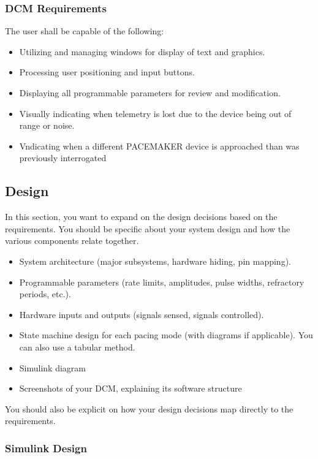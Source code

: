 \documentclass{article}
\begin{document}
\subsubsection{DCM Requirements}
The user shall be capable of the following:
\begin{itemize}
    \item Utilizing and managing windows for display of text and graphics.
    \item Processing user positioning and input buttons.
    \item Displaying all programmable parameters for review and modification.
    \item Visually indicating when telemetry is lost due to the device being out of range or noise.
    \item Vndicating when a different PACEMAKER device is approached than was previously interrogated
\end{itemize}

\newpage
\subsection{Design}
\label{dessec}
In this section, you want to expand on the design decisions based on the requirements. You should be specific about your system design and how the various components relate together.

\begin{itemize}
    \item System architecture (major subsystems, hardware hiding, pin mapping).
    \item Programmable parameters (rate limits, amplitudes, pulse widths, refractory periods, etc.).
    \item Hardware inputs and outputs (signals sensed, signals controlled).
    \item State machine design for each pacing mode (with diagrams if applicable). You can also use a tabular method.
    \item Simulink diagram
    \item Screenshots of your DCM, explaining its software structure
\end{itemize}

You should also be explicit on how your design decisions map directly to the requirements.

\newpage
\subsubsection{Simulink Design}
\end{document}
